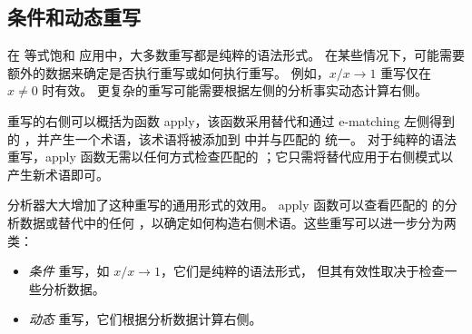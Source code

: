 \subsection{条件和动态重写}
\label{sec:rewrites}

在 等式饱和 应用中，大多数重写都是纯粹的语法形式。
在某些情况下，可能需要额外的数据来确定是否执行重写或如何执行重写。
例如，$x / x \to 1$ 重写仅在 $x \neq 0$ 时有效。
更复杂的重写可能需要根据左侧的分析事实动态计算右侧。

重写的右侧可以概括为函数 \textsf{apply}，该函数采用替代和通过 e-matching 左侧得到的 \eclass，并产生一个术语，该术语将被添加到 \egraph 中并与匹配的 \eclass 统一。
对于纯粹的语法重写，\textsf{apply} 函数无需以任何方式检查匹配的 \eclass；它只需将替代应用于右侧模式以产生新术语即可。

\eclass 分析器大大增加了这种重写的通用形式的效用。
\textsf{apply} 函数可以查看匹配的 \eclass 的分析数据或替代中的任何 \eclasses，以确定如何构造右侧术语。这些重写可以进一步分为两类：
\begin{itemize}
  \item \textit{条件} 重写，如 $x / x \to 1$，它们是纯粹的语法形式，
    但其有效性取决于检查一些分析数据。
  \item \textit{动态} 重写，它们根据分析数据计算右侧。
\end{itemize}

